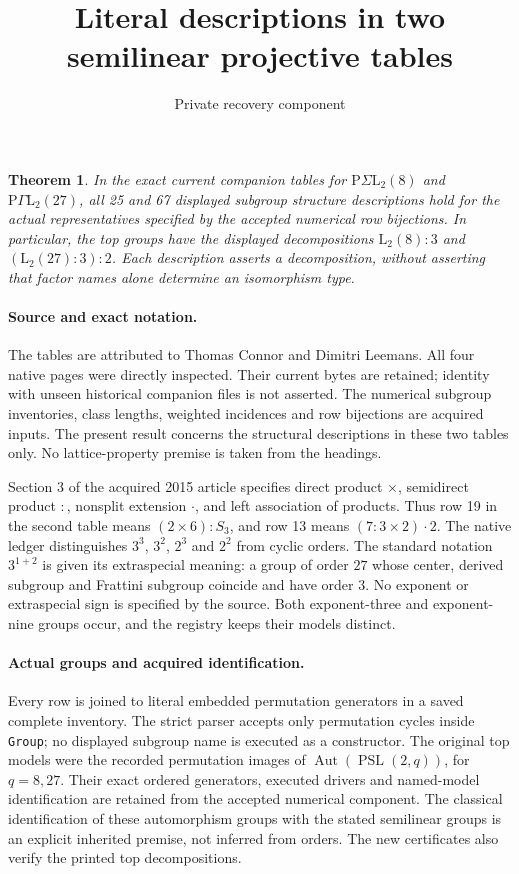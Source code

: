 \documentclass[11pt]{article}
\title{Literal descriptions in two semilinear projective tables}
\author{Private recovery component}\date{}
\newtheorem{theorem}{Theorem}
\begin{document}
\maketitle
\begin{theorem}
In the exact current companion tables for $\mathrm{P}\Sigma\mathrm L_2(8)$
and $\mathrm{P}\Gamma\mathrm L_2(27)$, all 25 and 67 displayed subgroup
structure descriptions hold for the actual representatives specified by
the accepted numerical row bijections. In particular, the top groups have
the displayed decompositions $\mathrm L_2(8):3$ and
$(\mathrm L_2(27):3):2$. Each description asserts a decomposition, without
asserting that factor names alone determine an isomorphism type.
\end{theorem}

\paragraph{Source and exact notation.}
The tables are attributed to Thomas Connor and Dimitri Leemans. All four
native pages were directly inspected. Their current bytes are retained;
identity with unseen historical companion files is not asserted. The
numerical subgroup inventories, class lengths, weighted incidences and
row bijections are acquired inputs. The present result concerns the
structural descriptions in these two tables only. No lattice-property
premise is taken from the headings.

Section 3 of the acquired 2015 article specifies direct product $\times$,
semidirect product $:$, nonsplit extension $\mathbin{\cdot}$, and left
association of products. Thus row 19 in the second table means
$(2\times6):S_3$, and row 13 means $(7:3\times2)\mathbin{\cdot}2$.
The native ledger distinguishes $3^3$, $3^2$, $2^3$ and $2^2$ from cyclic
orders. The standard notation $3^{1+2}$ is given its extraspecial meaning:
a group of order $27$ whose center, derived subgroup and Frattini subgroup
coincide and have order $3$. No exponent or extraspecial sign is specified
by the source. Both exponent-three and exponent-nine groups occur, and
the registry keeps their models distinct.

\paragraph{Actual groups and acquired identification.}
Every row is joined to literal embedded permutation generators in a saved
complete inventory. The strict parser accepts only permutation cycles
inside \texttt{Group}; no displayed subgroup name is executed as a
constructor. The original top models were the recorded permutation images
of $\operatorname{Aut}(\operatorname{PSL}(2,q))$, for $q=8,27$.
Their exact ordered generators, executed drivers and named-model
identification are retained from the accepted numerical component.
The classical identification of these automorphism groups with the stated
semilinear groups is an explicit inherited premise, not inferred from
orders. The new certificates also verify the printed top decompositions.
\end{document}

